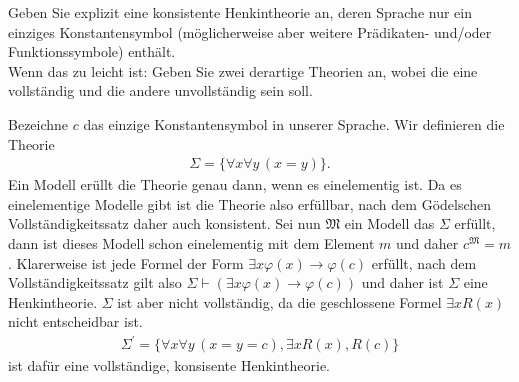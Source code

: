 
\begin{exercise}[138]

Geben Sie explizit eine konsistente Henkintheorie an, deren Sprache nur ein
einziges Konstantensymbol (möglicherweise aber weitere Prädikaten- und/oder
Funktionssymbole) enthält. \\
Wenn das zu leicht ist: Geben Sie zwei derartige Theorien an, wobei die eine
vollständig und die andere unvollständig sein soll.

\end{exercise}


\begin{solution}
Bezeichne $c$ das einzige Konstantensymbol in unserer Sprache. Wir definieren die Theorie
\begin{align*}
  \Sigma = \{\forall x \forall y\, (x = y)\}.
\end{align*}
Ein Modell erüllt die Theorie genau dann, wenn es einelementig ist. Da es einelementige Modelle gibt ist die Theorie also erfüllbar, nach dem Gödelschen Vollständigkeitssatz daher auch konsistent. Sei nun $\mathfrak{M}$ ein Modell das $\Sigma$ erfüllt, dann ist dieses Modell schon einelementig mit dem Element $m$ und daher $c^{\mathfrak{M}} = m$. Klarerweise ist jede Formel der Form $\exists x \varphi(x) \rightarrow \varphi(c)$ erfüllt, nach dem Vollständigkeitssatz gilt also $\Sigma \vdash (\exists x \varphi(x) \rightarrow \varphi(c))$ und daher ist $\Sigma$ eine Henkintheorie.
$\Sigma$ ist aber nicht vollständig,
da die geschlossene Formel $\exists x R(x)$ nicht entscheidbar ist.
\begin{align*}
  \Sigma^{\prime} = \{\forall x \forall y\, (x = y = c), \exists x R(x), R(c)\}
\end{align*}
ist dafür eine vollständige, konsisente Henkintheorie.
\end{solution}

